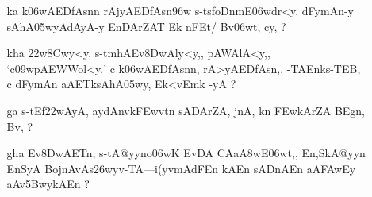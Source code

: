 \def\DevnagVersion{2.15}\documentclass{article}
\begin{document}
\begin{itemize}
\begin{itemize}
                 \item[\dn ka] {\dn s\2-tA@yynA<dyAy Bv(\3FEwd\?f\? upl<ymAnA, \322w\388wADAyEn DyA, Ek\2-vzpA, Ek\2 \3FEwmAZA, vA {\rs ?\re} eqA\2 \322w\388wADyAnA a\306wytm\?{\rs ,\re} y(kAyo{\qvb} v\?f\?n t\?qA\2 Evsg\0,{\rs ,\re} tEdtrkAy\0 EvEn>y\306wt\? n Ek ErfA\2 t\?qA\2 kAy\0\306wtAr\? EvEnyog\2 \3FEwfA-t\2 Bv\306wt, m\306wy\?r {\rs ?\re}}
                 
                 \item[\dn kha] {\dn ydA aEDfAsn\?n -vAEmnA aEDkArA, aA(msA(tA,{\rs ,\re} rAjs\2-TAnAEn c EvlFnAEn{\rs ,\re} tt,\3FEw\5Et Bv(\3FEwd\?f\? Ev\38DwmAn\?n sAM\3FEwEtk\?n \3FEwfAsn\?n sEct aAyojn\2 t\2 Ek y\?n s\2-tEv\392w\389wc, s\2-tpFW\?<y\35BwC t\4-t\4, rAjs\2-TAnAEDp\4, -vAEmEB\396w \3FEwA EdymAn\2 sAhA\305wy\2 yTAv\0 s\2t\306wy\?t {\rs ?\re}}
  
                \end{itemize} 
                
\item[\dn 32] \begin{itemize}
               
               \item[\dn ka] {\dn k\?\306wAEDfAsn\?n rAjyAEDfAsn\4\396w s\2-ts\2foDnmE\306wdr\?<y, dFymAn-y sAhA\305wyAdAyA-y EnDA\0rZAT\0 Ek\2 nFEt/\2 Bv\306wt, cy\?, {\rs ?\re}}  
                
               \item[\dn kha] {\dn \322w\38Cw\?y\?<y, s\2-tmhAEv\38DwAly\?<y,{\rs ,\re} pAWAlA<y,{\rs ,\re} {\rs `\re}c\309wpAEWWol\?<y,{\rs '\re} c k\?\306wAEDfAsn\?n{\rs ,\re} rA>yAEDfAsn\4,{\rs ,\re} -TAEnks\2-TEB, c dFymAn aAET\0ksAhA\305wy, Ek\2<vEmk\2 -yA {\rs ?\re} } 
               
               \item[\dn ga] {\dn s\2-tEf\322wAyA, ay\0dAnv\0k\3FEwvt\0n\? sADArZA, jnA, k\?n \3FEwkAr\?ZA BEgn, Bv\?, {\rs ?\re}}
               
               \item[\dn gha] {\dn Ev\38DwAET\0n, s\2-tA@yyno\306wK EvDA\2 CAa\3A8wE\306wt,{\rs ,\re} En,SkA@yyn En\0SyA BojnAvAs\326wyv-TA{\rs ---\re}i(y\?vmAdFEn kAEn sADnAEn aA\3FAwEy aAv\35BwykAEn {\rs ?\re}}
               

\end{itemize}
\end{itemize}
\end{document}
